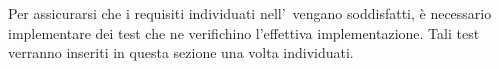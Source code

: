 Per assicurarsi che i requisiti individuati nell'\AdR \ vengano soddisfatti, è necessario implementare dei test che ne verifichino l'effettiva implementazione.
\newline
Tali test verranno inseriti in questa sezione una volta individuati.